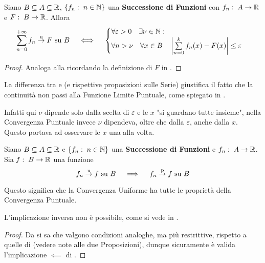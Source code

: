 \begin{proposition}
	Siano $B \subseteq A \subseteq \mathbb{R}$, $\left\{f_n:\; n \in \mathbb{N}\right\}$ una \textbf{Successione di Funzioni} con $f_n:\; A \to \mathbb{R}$ e $F:\; B \to \mathbb{R}$. Allora
	\[
		\sum\limits_{n = 0}^{+\infty} f_n \overset{\text{u}}{\to} F \text{ su } B
		\quad \iff \quad
		\begin{cases}
			\forall \varepsilon > 0 \quad \exists \nu \in \mathbb{N}:\\
			\forall n > \nu \quad \forall x \in B \quad \left|\sum\limits_{n = 0}^{k} f_n(x) - F(x)\right| \leq \varepsilon
		\end{cases}
	\]
	\begin{proof}
		Analoga alla  ricordando la definizione di $F$ in .
	\end{proof}
\end{proposition}
\begin{observation}
	\label{obs:diff_conv_unif_e_conv_punt}
	La differenza tra  e  (e rispettive proposizioni sulle Serie) giustifica il fatto che la continuità non passi alla Funzione Limite Puntuale, come spiegato in .

	Infatti qui $\nu$ dipende solo dalla scelta di $\varepsilon$ e le $x$ "si guardano tutte insieme", nella Convergenza Puntuale invece $\nu$ dipendeva, oltre che dalla $\varepsilon$, anche dalla $x$. Questo portava ad osservare le $x$ una alla volta.
\end{observation}
\begin{corollary}
	\label{coro:if_unif_conv_then_punt_conv}
	Siano $B \subseteq A \subseteq \mathbb{R}$ e $\left\{f_n:\; n \in \mathbb{N}\right\}$ una \textbf{Successione di Funzioni} e $f_n:\; A \to \mathbb{R}$. Sia $f:\; B \to \mathbb{R}$ una funzione
	\[f_n \overset{\text{u}}{\to} f \text{ su } B \quad \implies \quad  f_n \overset{\text{p}}{\to} f \text{ su } B\]
	\vspace*{-\baselineskip}
	\begin{note}
		Questo significa che la Convergenza Uniforme ha tutte le proprietà della Convergenza Puntuale.
	\end{note}
	\begin{note}
		L'implicazione inversa non è possibile, come si vede in .
	\end{note}
	\begin{proof}
		Da   si sa che valgono condizioni analoghe, ma più restrittive, rispetto a quelle di  (vedere note alle due Proposizioni), dunque sicuramente è valida l'implicazione $\impliedby$ di .
	\end{proof}
\end{corollary}
